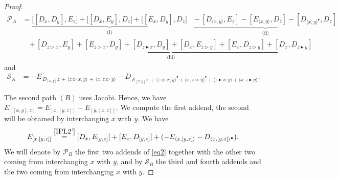 \documentclass[10pt]{article}
\theoremstyle{definition}
\newcommand{\wt}{\vartriangleright}
\newcommand{\bt}{\blacktriangleright}
\newcommand{\ab}[2]{\langle #1,#2\rangle}
\newcommand{\abd}[2]{\langle #1,#2\rangle^{\bullet}}
\begin{document}
\begin{proof}
\begin{align*}
\mathcal P_A&= \underbrace{\bigl[[D_x,D_y],E_z\bigr]+\bigl[[D_x,E_y],D_z\bigr]+\bigl[[E_x,D_y],D_z\bigr]}_{\text{(i)}}\quad\underbrace{-\,[D_{\ab{x}{y}},E_z]-[E_{\ab{x}{y}},D_z]-[D_{\abd{x}{y}},D_z]}_{\text{(ii)}}\\[2pt]
&\quad \underbrace{+\,[D_{z\wt x},E_y]+[E_{z\wt x},D_y]+[D_{z\bt x},D_y]+[D_x,E_{z\wt y}]+[E_x,D_{z\wt y}]+[D_x,D_{z\bt y}]}_{\text{(iii)}}\, 
\end{align*}
and 
\begin{align*}
\mathcal S_A &= -E_{\,D_{[x,y]}z\,+\,\ab{z\wt x}{y}\,+\,\ab{x}{z\wt y}}-D_{\,E_{[x,y]}z\,+\,\abd{z\wt x}{y}+\abd{x}{z\wt y}+\ab{z\bt x}{y}+\ab{x}{z\bt y}} .
\end{align*}

\medskip
The second path $(B)$ uses Jacobi. Hence, we have $ E_{[[x,y],z]}=E_{[x,[y,z]]}-E_{[y,[x,z]]}$. We compute the first addend, the second will be obtained by interchanging $x$ with $y$. We have
\begin{equation}\label{eq2}
E_{[x,[y,z]]}\overset{\eqref{IPL2'}}{=}[D_x,E_{[y,z]}]+[E_x,D_{[y,z]}]+(-E_{\ab{x}{[y,z]}}-D_{\abd{x}{[y,z]}}).
\end{equation}
We will denote by $\mathcal{P}_{B}$ the first two addends of \eqref{eq2} together with the other two coming from interchanging $x$ with $y$, and by $\mathcal{S}_{B}$ the third and fourth addends and the two coming from interchanging $x$ with $y$.



\end{proof}
\end{document}
